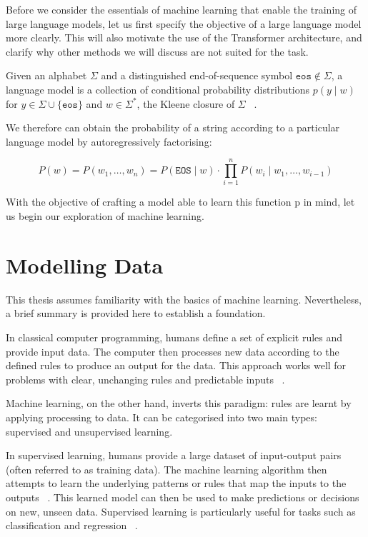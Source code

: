 \documentclass[a4paper, oneside]{discothesis}
\begin{document}
Before we consider the essentials of machine learning that enable the training of large language models, let us first specify the objective of a large language model more clearly. 
This will also motivate the use of the Transformer architecture, and clarify why other methods we will discuss are not suited for the task.

\begin{theorem} \label{thm:first theorem}
    Given an alphabet $\Sigma$ and a distinguished end-of-sequence symbol $\texttt{eos} \notin \Sigma$, a
    language model is a collection of conditional probability distributions $p(y \mid w)$ for $y \in \Sigma \cup \{\texttt{eos}\}$ and $w \in \Sigma^*$,
    the Kleene closure of $\Sigma$ ~\cite{cotterell2024formalaspectslanguagemodeling}.
\end{theorem}

We therefore can obtain the probability of a string according to a particular language model by autoregressively factorising:

\begin{equation}
    P(w) = P(w_1, \ldots, w_n) =  P(\texttt{EOS} \mid w) \cdot \prod_{i=1}^n P(w_i \mid w_1, \ldots, w_{i-1}) 
\end{equation}

With the objective of crafting a model able to learn this function p in mind, let us begin our exploration of machine learning. 

\section{Modelling Data}

This thesis assumes familiarity with the basics of machine learning. Nevertheless, a brief summary is provided here to establish a foundation.

In classical computer programming, humans define a set of explicit rules and provide input data. The computer then processes new data according to the defined rules to produce an output for the data. This approach works well for problems with clear, unchanging rules and predictable inputs ~\cite{russell2010artificial}.

Machine learning, on the other hand, inverts this paradigm: rules are learnt by applying processing to data. It can be categorised into two main types: supervised and unsupervised learning.

In supervised learning, humans provide a large dataset of input-output pairs (often referred to as training data). 
The machine learning algorithm then attempts to learn the underlying patterns or rules that map the inputs to the outputs ~\cite{hastie01statisticallearning}. 
This learned model can then be used to make predictions or decisions on new, unseen data.
Supervised learning is particularly useful for tasks such as classification and regression ~\cite{bishop2006pattern}.
\end{document}
